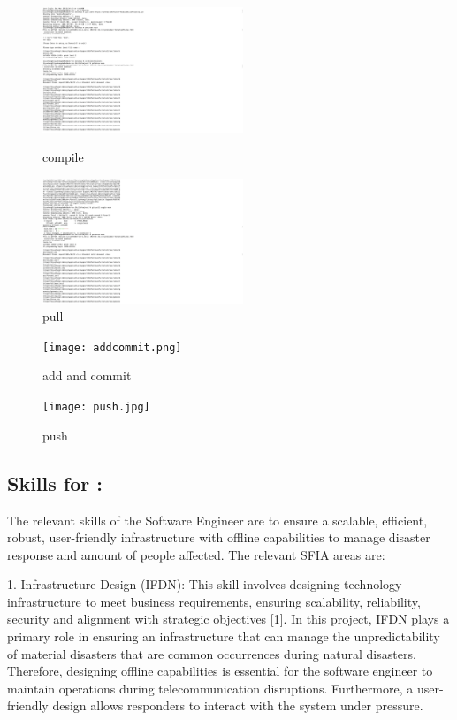 \documentclass[a4paper, 11pt]{report}
\begin{document}
\begin{enumerate}
\begin{figure}[htbp]
\centering
\begin{minipage}[t]{0.48\textwidth}
\centering
\includegraphics[width=6cm]{compile.png}
\caption{compile}
\end{minipage}
\begin{minipage}[t]{0.48\textwidth}
\centering
\includegraphics[width=6cm]{pull.jpg}
\caption{pull}
\end{minipage}
\end{figure}

\begin{figure}[htbp]
\centering
\begin{minipage}[t]{0.48\textwidth}
\centering
\texttt{[image: addcommit.png]}
\caption{add and commit}
\end{minipage}
\begin{minipage}[t]{0.48\textwidth}
\centering
\texttt{[image: push.jpg]}
\caption{push}
\end{minipage}
\end{figure}






\subsection{Skills for \majC: \studC}

The relevant skills of the Software Engineer are to ensure a scalable, efficient, robust, user-friendly infrastructure with offline capabilities to manage disaster response and amount of people affected. The relevant SFIA areas are:

1. Infrastructure Design (IFDN): This skill involves designing technology infrastructure to meet business requirements, ensuring scalability, reliability, security and alignment with strategic objectives [1]. In this project, IFDN plays a primary role in ensuring an infrastructure that can manage the unpredictability of material disasters that are common occurrences during natural disasters. Therefore, designing offline capabilities is essential for the software engineer to maintain operations during telecommunication disruptions. Furthermore, a user-friendly design allows responders to interact with the system under pressure.


\end{enumerate}
\end{document}
